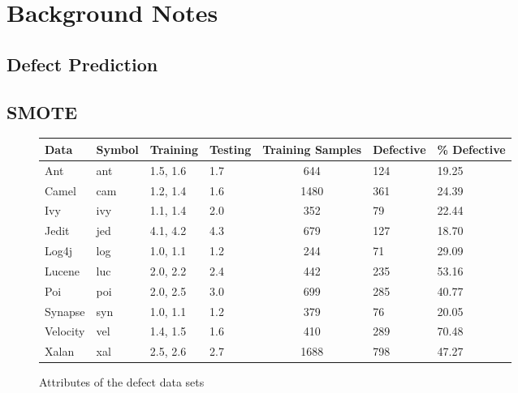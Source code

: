 \documentclass[12pt, journal, compsoc]{IEEEtran}
\begin{document}
\section{Background Notes}
\label{back}
\subsection{Defect Prediction}
\subsection{SMOTE}
\begin{figure}[!htbp]
  \renewcommand{\baselinestretch}{1.25}\begin{center}
    {\tiny
      \begin{tabular}{l@{~~~}l@{~~~}l@{~~~}l@{~~~}c@{~~~}l@{~~~}l@{~~~}}
        \hline
        \rowcolor{lightgray}
        Data & Symbol & Training & Testing & Training Samples& Defective &\% Defective \\\hline
        
        Ant & ant & 1.5, 1.6  &1.7 & 644&124&19.25\\
        
        Camel & cam & 1.2, 1.4 & 1.6 & 1480&361 & 24.39\\
        
        Ivy & ivy & 1.1, 1.4 & 2.0  & 352 & 79 & 22.44\\
        
        Jedit & jed & 4.1, 4.2 & 4.3 & 679 & 127 & 18.70\\
        
        Log4j & log & 1.0, 1.1 & 1.2 & 244 & 71 & 29.09\\
        
        Lucene & luc & 2.0, 2.2 & 2.4 & 442 & 235 & 53.16\\
        
        Poi & poi & 2.0, 2.5 & 3.0 & 699 & 285 & 40.77\\
        
        Synapse & syn & 1.0, 1.1 & 1.2 & 379 & 76 & 20.05\\
        
        Velocity & vel & 1.4, 1.5 & 1.6 & 410& 289 & 70.48\\
        
        Xalan & xal &2.5, 2.6 &2.7 & 1688 & 798 & 47.27\\\hline
      \end{tabular}}
    \end{center}
    \caption{Attributes of the defect data sets}\label{fig:ck}
  \end{figure}
\end{document}
